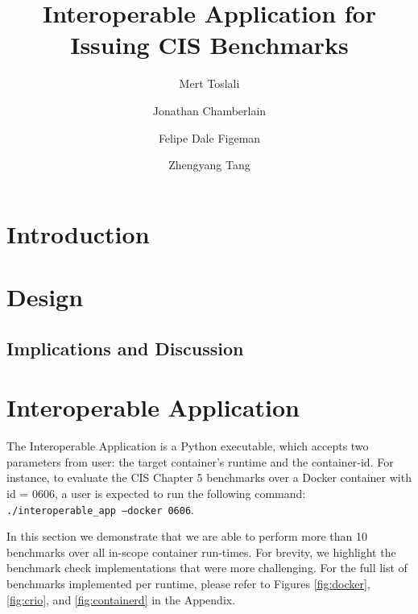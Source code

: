 \documentclass[times, twoside, watermark]{zHenriquesLab-StyleBioRxiv}
\begin{document}
\title{Interoperable Application for Issuing CIS Benchmarks }


\author[1]{Mert Toslali}
\author[1]{Jonathan Chamberlain}
\author[1]{Felipe Dale Figeman}
\author[1]{Zhengyang Tang}


\maketitle

\begin{abstract}

\end {abstract}



\section*{Introduction}
\label{section:introduction}


\section*{Design}


\subsection*{Implications and Discussion}





\section*{Interoperable Application}

The Interoperable Application is a Python executable, which accepts two parameters from user: the target container's runtime and the container-id. For instance, to evaluate the CIS Chapter 5 benchmarks over a Docker container with id = 0606, a user is expected to run the following command:
\texttt{./interoperable\_app --docker 0606}.

In this section we demonstrate that we are able to perform more than 10 benchmarks over all in-scope container run-times. For brevity, we highlight the benchmark check implementations that were more challenging. For the full list of benchmarks implemented per runtime, please refer to Figures \ref{fig:docker}, \ref{fig:crio}, and \ref{fig:containerd} in the Appendix.



\end{document}
